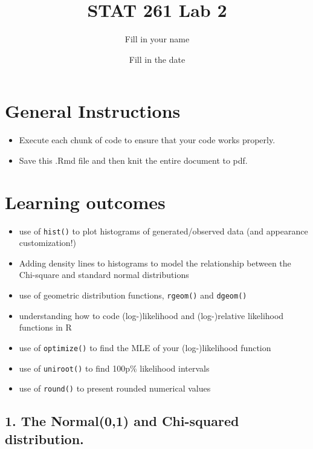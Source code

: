 \documentclass[
]{article}
\title{STAT 261 Lab 2}
\author{Fill in your name}
\date{Fill in the date}
\providecommand{\tightlist}{%
  \setlength{\itemsep}{0pt}\setlength{\parskip}{0pt}}
\begin{document}
\maketitle

\hypertarget{general-instructions}{%
\section{General Instructions}\label{general-instructions}}

\begin{itemize}
\tightlist
\item
  Execute each chunk of code to ensure that your code works properly.\\
\item
  Save this .Rmd file and then knit the entire document to pdf.
\end{itemize}

\hypertarget{learning-outcomes}{%
\section{Learning outcomes}\label{learning-outcomes}}

\begin{itemize}
\tightlist
\item
  use of \texttt{hist()} to plot histograms of generated/observed data
  (and appearance customization!)\\
\item
  Adding density lines to histograms to model the relationship between
  the Chi-square and standard normal distributions\\
\item
  use of geometric distribution functions, \texttt{rgeom()} and
  \texttt{dgeom()}\\
\item
  understanding how to code (log-)likelihood and (log-)relative
  likelihood functions in R\\
\item
  use of \texttt{optimize()} to find the MLE of your (log-)likelihood
  function\\
\item
  use of \texttt{uniroot()} to find 100p\% likelihood intervals\\
\item
  use of \texttt{round()} to present rounded numerical values
\end{itemize}

\hypertarget{the-normal01-and-chi-squared-distribution.}{%
\subsection{1. The Normal(0,1) and Chi-squared
distribution.}\label{the-normal01-and-chi-squared-distribution.}}
\end{document}
